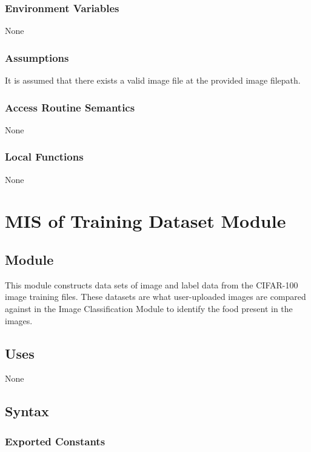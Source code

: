 \documentclass[12pt, titlepage]{article}
\begin{document}
\subsubsection{Environment Variables}

None

\subsubsection{Assumptions}

It is assumed that there exists a valid image file at the provided image filepath.

\subsubsection{Access Routine Semantics}

None

\subsubsection{Local Functions}

None

\newpage

\section{MIS of Training Dataset Module} \label{Module}

\subsection{Module}

This module constructs data sets of image and label data from the CIFAR-100 image training files. These datasets are what user-uploaded images are compared against in the Image Classification Module to identify the food present in the images. 

\subsection{Uses}

None

\subsection{Syntax}

\subsubsection{Exported Constants}
\end{document}

